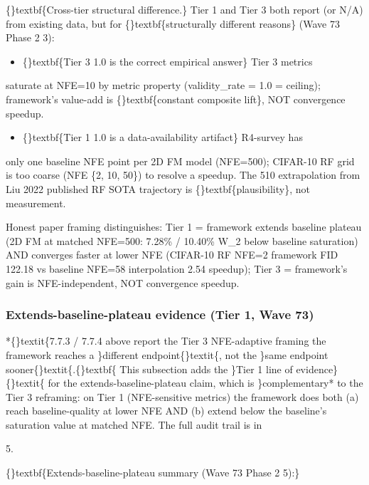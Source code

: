 \documentclass{article}
\begin{document}
\{\}textbf\{Cross-tier structural difference.\} Tier 1 and Tier 3 both report  (or N/A) from existing data, but for \{\}textbf\{structurally different reasons\} (Wave 73 Phase 2 3):

\begin{itemize}
\item \{\}textbf\{Tier 3 1.0 is the correct empirical answer\}  Tier 3 metrics
\end{itemize}
saturate at NFE=10 by metric property (validity\_rate = 1.0 = ceiling); framework's value-add is \{\}textbf\{constant composite lift\}, NOT convergence speedup.

\begin{itemize}
\item \{\}textbf\{Tier 1 1.0 is a data-availability artifact\}  R4-survey has
\end{itemize}
only one baseline NFE point per 2D FM model (NFE=500); CIFAR-10 RF grid is too coarse (NFE  \{2, 10, 50\}) to resolve a speedup. The 510 extrapolation from Liu 2022 published RF SOTA trajectory is \{\}textbf\{plausibility\}, not measurement.

Honest paper framing distinguishes: Tier 1 = framework extends baseline plateau (2D FM at matched NFE=500: 7.28\% / 10.40\% W\_2 below baseline saturation) AND converges faster at lower NFE (CIFAR-10 RF NFE=2 framework FID 122.18 vs baseline NFE=58 interpolation  2.54 speedup); Tier 3 = framework's gain is NFE-independent, NOT convergence speedup.

\subsubsection{Extends-baseline-plateau evidence (Tier 1, Wave 73)}
*\{\}textit\{7.7.3 / 7.7.4 above report the Tier 3 NFE-adaptive framing  the framework reaches a \}different endpoint\{\}textit\{, not the \}same endpoint sooner\{\}textit\{.\{\}textbf\{ This subsection adds the \}Tier 1 line of evidence\}\{\}textit\{ for the extends-baseline-plateau claim, which is \}complementary* to the Tier 3 reframing: on Tier 1 (NFE-sensitive metrics) the framework does both (a) reach baseline-quality at lower NFE AND (b) extend below the baseline's saturation value at matched NFE. The full audit trail is in

 5.

\{\}textbf\{Extends-baseline-plateau summary (Wave 73 Phase 2 5):\}
\end{document}
